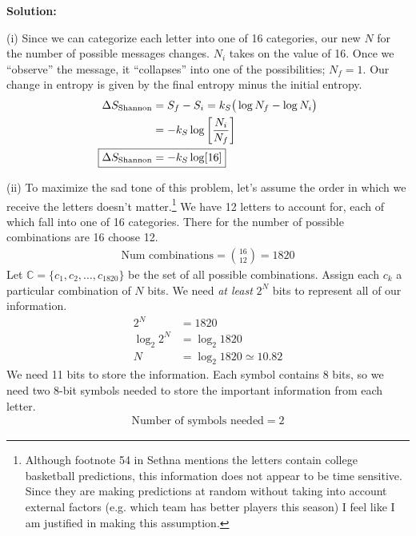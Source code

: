\documentclass[11pt,letterpaper]{article}
\newenvironment{solution}{
\bigbreak
\noindent
\textbf{Solution:}
}
\numberwithin{equation}{section}
\numberwithin{figure}{section}
\begin{document}
\begin{solution}
(i) Since we can categorize each letter into one of 16 categories, our new $N$ for the number of possible messages changes. $N_i$ takes on the value of 16. Once we ``observe'' the message, it ``collapses'' into one of the possibilities; $N_f = 1$. Our change in entropy is given by the final entropy minus the initial entropy.
\begin{align}
\Delta S_\text{Shannon}& = S_f - S_i = k_S \big( \log N_f - \log N_i \big)
\\
& = - k_S \log \bigg[ \frac{N_i}{N_f} \bigg]
\\
\Aboxed{
\Delta S_\text{Shannon}& = - k_S \log[16]
}
\end{align}

\bigbreak
\noindent
(ii) To maximize the sad tone of this problem, let's assume the order in which we receive the letters doesn't matter.\footnote{Although footnote 54 in Sethna mentions the letters contain college basketball predictions, this information does not appear to be time sensitive. Since they are making predictions at random without taking into account external factors (e.g. which team has better players this season) I feel like I am justified in making this assumption.}
We have 12 letters to account for, each of which fall into one of 16 categories. There for the number of possible combinations are 16 choose 12.
\begin{gather}
\text{Num combinations} = \binom{16}{12} = 1820
\end{gather}
Let $\mathbb{C} = \{c_1,c_2, \dots, c_{1820}\}$ be the set of all possible combinations. Assign each $c_k$ a particular combination of $N$ bits. We need \emph{at least} $2^N$ bits to represent all of our information.
\begin{align}
2^N& = 1820
\\
\log_2 2^N& = \log_2 1820
\\
N& = \log_2 1820 \simeq 10.82
\end{align}
We need 11 bits to store the information. Each symbol contains 8 bits, so we need two 8-bit symbols needed to store the important information from each letter.
\begin{gather}
	\boxed{
\text{Number of symbols needed} = 2
}
\end{gather}

\end{solution}
\end{document}
